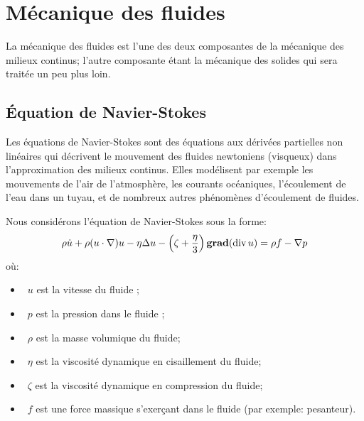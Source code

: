 \medskip
\section{Mécanique des fluides}
La mécanique des fluides est l'une des deux composantes de la mécanique des milieux continus; l'autre composante étant la mécanique des solides qui sera traitée un peu plus loin.





\medskip
\subsection{Équation de Navier-Stokes}\label{Sec-NavierStokes}
Les équations de Navier-Stokes sont des équations aux dérivées partielles non linéaires qui décrivent le mouvement des fluides newtoniens (visqueux) dans l'approximation des milieux continus. Elles modélisent par exemple les mouvements de l'air de l'atmosphère, les courants océaniques, l'écoulement de l'eau dans un tuyau, et de nombreux autres phénomènes d'écoulement de fluides.

\medskip
Nous considérons l'équation de Navier-Stokes sous la forme:
\begin{equation}
\rho \dot{u} + \rho (u\cdot\nabla)u - \eta \Delta u
- \left( \zeta + \frac{\eta}{3} \right) \operatorname{\mathbf{grad}} (\operatorname{div} u)
= \rho f - \nabla p
\end{equation}
où:
\begin{itemize}
  \item~$u$ est la vitesse du fluide ;
  \item~$p$ est la pression dans le fluide ;
  \item~$\rho$ est la masse volumique du fluide;
  \item~$\eta$ est la viscosité dynamique en cisaillement du fluide;
  \item~$\zeta$ est la viscosité dynamique en compression du fluide;
  \item~$f$ est une force massique s'exerçant dans le fluide (par exemple: pesanteur).
\end{itemize}

